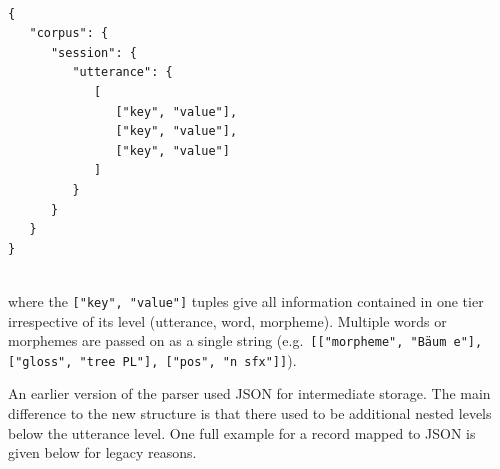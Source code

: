 \documentclass[a4paper, 11pt]{book}
\begin{document}
\begin{verbatim}

{
   "corpus": {
      "session": {
         "utterance": {
            [
               ["key", "value"], 
               ["key", "value"],
               ["key", "value"]
            ]
         }
      }
   }
}
	
\end{verbatim}

where the \texttt{["key", "value"]} tuples give all information contained in one tier irrespective of its level (utterance, word, morpheme). Multiple words or morphemes are passed on as a single string (e.g.\ \texttt{[["morpheme", "Bäum e"], ["gloss", "tree PL"], ["pos", "n sfx"]]}). 

%

An earlier version of the parser used JSON for intermediate storage. The main difference to the new structure is that there used to be additional nested levels below the utterance level. One full example for a record mapped to JSON is given below for legacy reasons. 

\end{document}

